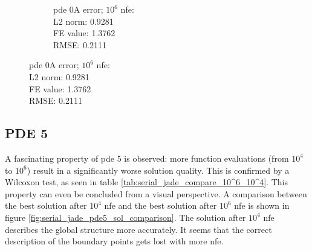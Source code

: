 \documentclass[./\jobname.tex]{subfiles}
\begin{document}
\begin{figure}[H]
\begin{subfigure}[b]{0.45\linewidth}
		\caption{\gls{pde} 0A error; $10^6$ \gls{nfe}: \\ L2 norm: 0.9281 \\ FE value: 1.3762 \\ RMSE: 0.2111}
		\label{fig:pde0a_sol_10_6}
	\end{subfigure}%
	\label{fig:serial_jade_pde0a_sol_comparison}
\end{figure}


\subsection{PDE 5}
\label{chap:ex0_pde5}
A fascinating property of \gls{pde} 5 is observed: more function evaluations (from $10^4$ to $10^6$) result in a significantly worse solution quality. This is confirmed by a Wilcoxon test, as seen in table \ref{tab:serial_jade_compare_10^6_10^4}. 
This property can even be concluded from a visual perspective. A comparison between the best solution after $10^4$ \gls{nfe} and the best solution after $10^6$ \gls{nfe} is shown in figure \ref{fig:serial_jade_pde5_sol_comparison}. The solution after $10^4$ \gls{nfe} describes the global structure more accurately. It seems that the correct description of the boundary points gets lost with more \gls{nfe}.
\end{document}
